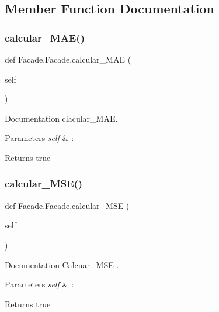\subsection{Member Function Documentation}
\mbox{\label{class_facade_1_1_facade_abb62f6ed9e166bc1041ad7a3c57c4d58}} 
\subsubsection{\texorpdfstring{calcular\+\_\+\+M\+A\+E()}{calcular\_MAE()}}
{\footnotesize\ttfamily def Facade.\+Facade.\+calcular\+\_\+\+M\+AE (\begin{DoxyParamCaption}\item[{}]{self }\end{DoxyParamCaption})}



Documentation clacular\+\_\+\+M\+AE. 


\begin{DoxyParams}{Parameters}
{\em self} & \+: \\
\hline
\end{DoxyParams}
\begin{DoxyReturn}{Returns}
true 
\end{DoxyReturn}
\mbox{\label{class_facade_1_1_facade_a37747590f3e1ade1250e56dd9c424d03}} 
\subsubsection{\texorpdfstring{calcular\+\_\+\+M\+S\+E()}{calcular\_MSE()}}
{\footnotesize\ttfamily def Facade.\+Facade.\+calcular\+\_\+\+M\+SE (\begin{DoxyParamCaption}\item[{}]{self }\end{DoxyParamCaption})}



Documentation Calcuar\+\_\+\+M\+SE . 


\begin{DoxyParams}{Parameters}
{\em self} & \+: \\
\hline
\end{DoxyParams}
\begin{DoxyReturn}{Returns}
true 
\end{DoxyReturn}
\mbox{\label{class_facade_1_1_facade_a85dbe0a181d1c4665004b284f13e3632}} 
